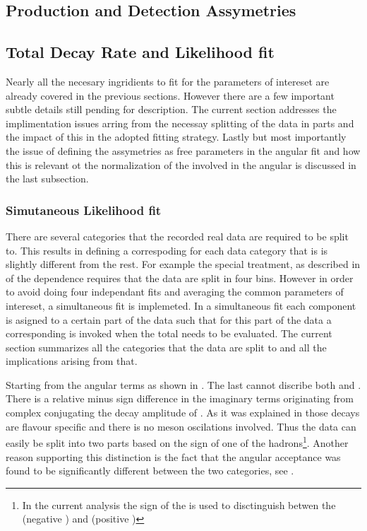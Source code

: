 \subsection{Production and Detection Assymetries}
\label{experimentalAssym}

\subsection{Total Decay Rate and Likelihood fit}
\label{Total_Decay_Rate}

Nearly all the necesary ingridients to fit for the parameters of intereset are already covered in the previous sections.
However there are a few important subtle details still pending for description. The current section addresses the 
implimentation issues arring from the necessay splitting of the data in parts and the impact of this in the adopted
fitting strategy. Lastly but most importantly the issue of defining the \ACP assymetries as free parameters in the
angular fit and how this is relevant ot the normalization of the \pdfs involved in the angular is discussed in the 
last subsection.

\subsubsection{Simutaneous Likelihood fit}
There are several categories that the recorded real data are required to be split to. This results in defining a correspoding \pdf
for each data category that is is slightly different from the rest. For example the special treatment, as described in \secref{} 
of the \mkpi dependence requires that the data are split in four \mkpi bins. However in order to avoid doing four independant fits
and averaging the common parameters of intereset, a simultaneous fit is implemeted. In a simultaneous fit each component \pdf is 
asigned to a certain part of the data such that for this part of the data a corresponding \pdf is invoked when the total \pdf needs
to be evaluated. The current section summarizes all the categories that the data are split to and all the implications arising from
that.

Starting from the angular \pdf terms as shown in . The last cannot discribe both \BsJpsiKst and \BsbarJpsiKst. 
There is a relative minus sign difference in the imaginary terms originating from complex conjugating the decay amplitude of 
\BsJpsiKst. As it was explained in \secref{} those decays are flavour specific and there is no \Bs meson oscilations involved. 
Thus the data can easily be split into two parts based on the sign of one of the 
hadrons\footnote{In the current analysis the sign
of the \kaon is used to disctinguish betwen the \BsJpsiKst (negative \kaon) and \BsbarJpsiKst (positive \kaon) }.
Another reason supporting this distinction is the fact that the angular acceptance was found to be significantly different between
the two categories, see \tabref{}.

